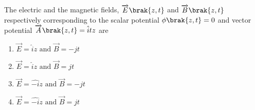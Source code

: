     \item The electric and the magnetic fields, $\overrightarrow{E} \brak{z,t}$ and $\overrightarrow{B} \brak{z,t}$ respectively corresponding to the scalar potential $\phi\brak{z,t}=0$ and vector potential $\overrightarrow{A} \brak{z,t} = \hat{i}tz$ are
     \begin{multicols}{2}
        \begin{enumerate}
            \item $\overrightarrow{E} = \hat{i}z \text{ and } \overrightarrow{B} = -jt$
            \item$\overrightarrow{E} = \hat{i}z \text{ and } \overrightarrow{B} = jt$
            \item $\overrightarrow{E} = \hat{-i}z \text{ and } \overrightarrow{B} = -jt$
            \item $\overrightarrow{E} = \hat{-i}z \text{ and } \overrightarrow{B} = jt$
        \end{enumerate}
    \end{multicols}

